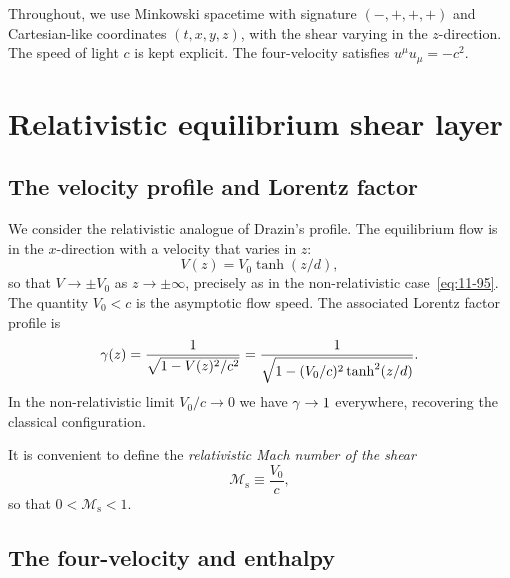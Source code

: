 Throughout, we use Minkowski spacetime with signature $(-,+,+,+)$ and
Cartesian-like coordinates $(t,x,y,z)$, with the shear varying in the
$z$-direction.  The speed of light $c$ is kept explicit.  The
four-velocity satisfies $u^\mu u_\mu = -c^2$.

\section{Relativistic equilibrium shear layer}
\label{sec:rel-11-104-eq}

\subsection{The velocity profile and Lorentz factor}
\label{sec:rel-11-104-eq-vel}

We consider the relativistic analogue of Drazin's profile.  The
equilibrium flow is in the $x$-direction with a velocity that varies
in $z$:
\begin{equation}
\label{eq:rel-104-1}
V(z) = V_0\tanh(z/d),
\end{equation}
so that $V\to \pm V_0$ as $z\to\pm\infty$, precisely as in the
non-relativistic case~\eqref{eq:11-95}.  The quantity $V_0 < c$ is the
asymptotic flow speed.  The associated Lorentz factor profile is
\begin{equation}
\label{eq:rel-104-2}
\gamma(z) = \frac{1}{\sqrt{1-V(z)^2/c^2}}
  = \frac{1}{\sqrt{1 - (V_0/c)^2\tanh^2(z/d)}}.
\end{equation}
In the non-relativistic limit $V_0/c\to 0$ we have $\gamma\to 1$
everywhere, recovering the classical configuration.

It is convenient to define the \emph{relativistic Mach number of the shear}
\begin{equation}
\label{eq:rel-104-3}
\mathcal{M}_{\mathrm{s}} \equiv \frac{V_0}{c},
\end{equation}
so that $0 < \mathcal{M}_{\mathrm{s}} < 1$.

\subsection{The four-velocity and enthalpy}
\label{sec:rel-11-104-eq-4vel}

